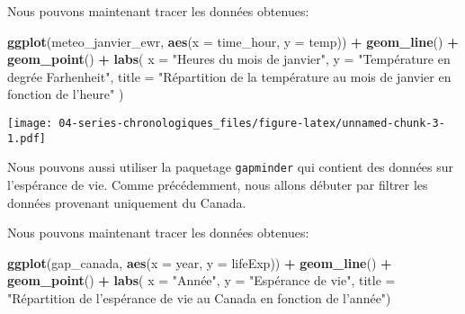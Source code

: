 \documentclass[]{book}
\newenvironment{Shaded}{\begin{snugshade}}{\end{snugshade}}
\newcommand{\KeywordTok}[1]{\textcolor[rgb]{0.13,0.29,0.53}{\textbf{#1}}}
\newcommand{\DataTypeTok}[1]{\textcolor[rgb]{0.13,0.29,0.53}{#1}}
\newcommand{\StringTok}[1]{\textcolor[rgb]{0.31,0.60,0.02}{#1}}
\newcommand{\OperatorTok}[1]{\textcolor[rgb]{0.81,0.36,0.00}{\textbf{#1}}}
\newcommand{\NormalTok}[1]{#1}
\begin{document}
Nous pouvons maintenant tracer les données obtenues:

\begin{Shaded}
\begin{Highlighting}[]
\KeywordTok{ggplot}\NormalTok{(meteo_janvier_ewr, }\KeywordTok{aes}\NormalTok{(}\DataTypeTok{x =}\NormalTok{ time_hour, }\DataTypeTok{y =}\NormalTok{ temp)) }\OperatorTok{+}
\StringTok{  }\KeywordTok{geom_line}\NormalTok{() }\OperatorTok{+}
\StringTok{  }\KeywordTok{geom_point}\NormalTok{() }\OperatorTok{+}
\StringTok{  }\KeywordTok{labs}\NormalTok{(}
    \DataTypeTok{x =} \StringTok{"Heures du mois de janvier"}\NormalTok{,}
    \DataTypeTok{y =} \StringTok{"Température en degrée Farhenheit"}\NormalTok{,}
    \DataTypeTok{title =} \StringTok{"Répartition de la température au mois de janvier en fonction de l'heure"}
\NormalTok{  )}
\end{Highlighting}
\end{Shaded}

\texttt{[image: 04-series-chronologiques\_files/figure-latex/unnamed-chunk-3-1.pdf]}

Nous pouvons aussi utiliser la paquetage \texttt{gapminder} qui contient
des données sur l'espérance de vie. Comme précédemment, nous allons
débuter par filtrer les données provenant uniquement du Canada.

\begin{Shaded}
\end{Shaded}

Nous pouvons maintenant tracer les données obtenues:

\begin{Shaded}
\begin{Highlighting}[]
\KeywordTok{ggplot}\NormalTok{(gap_canada, }\KeywordTok{aes}\NormalTok{(}\DataTypeTok{x =}\NormalTok{ year, }\DataTypeTok{y =}\NormalTok{ lifeExp)) }\OperatorTok{+}\StringTok{ }
\StringTok{  }\KeywordTok{geom_line}\NormalTok{() }\OperatorTok{+}\StringTok{ }\KeywordTok{geom_point}\NormalTok{() }\OperatorTok{+}
\StringTok{  }\KeywordTok{labs}\NormalTok{(}
    \DataTypeTok{x =} \StringTok{"Année"}\NormalTok{,}
    \DataTypeTok{y =} \StringTok{"Espérance de vie"}\NormalTok{,}
    \DataTypeTok{title =} \StringTok{"Répartition de l'espérance de vie au Canada en fonction de l'année"}\NormalTok{)}
\end{Highlighting}
\end{Shaded}
\end{document}
